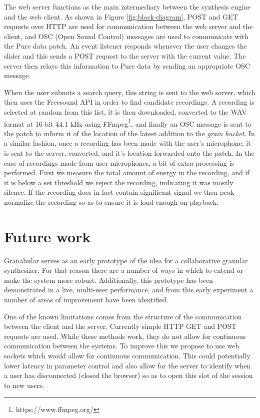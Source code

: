 \documentclass{nime-alternate}
\begin{document}
The web server functions as the main intermediary between the synthesis engine and the web client.
As shown in Figure \ref{fig:block-diagram}, POST and GET requests over HTTP are used for communication between the web server and the client,
and OSC (Open Sound Control) messages are used to communicate with the Pure data patch. 
An event listener responds whenever the user changes the slider and this sends a POST request to the server with the current value.
The server then relays this information to Pure data by sending an appropriate OSC message. 

When the user submits a search query, this string is sent to the web server, which then uses the Freesound API in order to find candidate recordings. 
A recording is selected at random from this list, it is then downloaded, converted to the WAV format at 16 bit 44.1 kHz using FFmpeg\footnote{https://www.ffmpeg.org/}, 
and finally an OSC message is sent to the patch to inform it of the location of the latest addition to the \emph{grain bucket}.
In a similar fashion, once a recording has been made with the user's microphone, it is sent to the server, converted, and it's location forwarded onto the patch.
In the case of recordings made from user microphones, a bit of extra processing is performed. 
First we measure the total amount of energy in the recording, and if it is below a set threshold we reject the recording, indicating it was mostly silence. 
If the recording does in fact contain significant signal we then peak normalize the recording so as to ensure it is loud enough on playback.

\section{Future work}

Granabular serves as an early prototype of the idea for a collaborative granular synthesizer.
For that reason there are a number of ways in which to extend or make the system more robust.
Additionally, this prototype has been demonstrated in a live, multi-user performance, and
from this early experiment a number of areas of improvement have been identified. 

One of the known limitations comes from the structure of the communication between the client 
and the server. Currently simple HTTP GET and POST requests are used. 
While these methods work, they do not allow for continuous communication between the systems.
To improve this we propose to use web sockets which would allow for continuous communication.
This could potentially lower latency in parameter control and also allow for the server to 
identify when a user has disconnected (closed the browser) so as to open this slot of the session to new users. 
\end{document}
